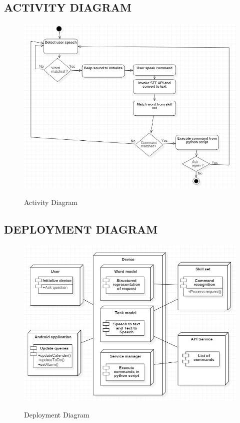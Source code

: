     \subsection*{ACTIVITY DIAGRAM}
    \begin{figure}[H]
  \centering
  \includegraphics[scale=0.75]{Activity.JPG}\\
  \caption{Activity Diagram}
\end{figure}
   \pagebreak 
   
    \subsection*{DEPLOYMENT DIAGRAM}
     \begin{figure}[H]
  \centering
  \includegraphics[scale=0.75]{Deployment.JPG}\\
  \caption{Deployment Diagram}
  \end{figure}
  \pagebreak
    

